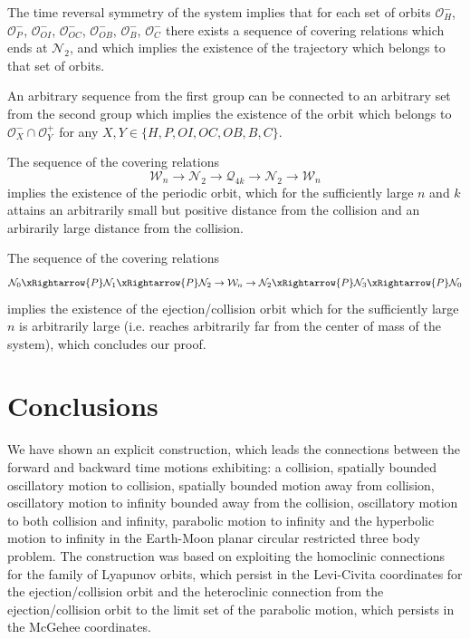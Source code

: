 \documentclass[1p]{article}
\begin{document}
The time reversal symmetry of the system implies that for each set of orbits $\mathcal{O}^-_H$, $\mathcal{O}^-_P$, $\mathcal{O}^-_{OI}$, $\mathcal{O}^-_{OC}$, $\mathcal{O}^-_{OB}$, $\mathcal{O}^-_B$, $\mathcal{O}^-_C$ there exists a sequence of covering relations which ends at $\mathcal{N}_2$, and which implies the existence of the trajectory which belongs to that set of orbits.

An arbitrary sequence from the first group can be connected to an arbitrary set from the second group which implies the existence of the orbit which belongs to $\mathcal{O}_X^- \cap \mathcal{O}_Y^+$ for any $X,Y \in \{H,P,OI,OC,OB,B,C\}$. 

The sequence of the covering relations
\[
    \mathcal{W}_n \rightarrow \mathcal{N}_2 \rightarrow \mathcal{Q}_{4k} \rightarrow \mathcal{N}_2 \rightarrow \mathcal{W}_n
\]
implies the existence of the periodic orbit, which for the sufficiently large $n$ and $k$ attains an arbitrarily small but positive distance from the collision and an arbirarily large distance from the collision.

The sequence of the covering relations
\[
    \mathcal{N}_0 \xRightarrow{P}
    \mathcal{N}_1 \xRightarrow{P}
    \mathcal{N}_2 \rightarrow \mathcal{W}_n \rightarrow
    \mathcal{N}_2 \xRightarrow{P}
    \mathcal{N}_3 \xRightarrow{P}
    \mathcal{N}_0
\]
implies the existence of the ejection/collision orbit which for the sufficiently large $n$ is arbitrarily large (i.e. reaches arbitrarily far from the center of mass of the system), which concludes our proof.

\section{Conclusions}
We have shown an explicit construction, which leads the connections between the forward and backward time motions exhibiting: a collision, spatially bounded oscillatory motion to collision, spatially bounded motion away from collision, oscillatory motion to infinity bounded away from the collision, oscillatory motion to both collision and infinity, parabolic motion to infinity and the hyperbolic motion to infinity in the Earth-Moon planar circular restricted three body problem. The construction was based on exploiting the homoclinic connections for the family of Lyapunov orbits, which persist in the Levi-Civita coordinates for the ejection/collision orbit and the heteroclinic connection from the ejection/collision orbit to the limit set of the parabolic motion, which persists in the McGehee coordinates. 
\end{document}
